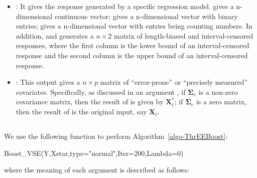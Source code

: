\begin{itemize}
    \item {}: It gives the response generated by a specific regression model.  gives a n-dimensional continuous vector;  gives a n-dimensional vector with binary entries;  gives a n-dimensional vector with entries being counting numbers. In addition,  and  generates a $n\times 2$ matrix of length-biased and interval-censored responses, where the first column is the lower bound of an interval-censored response and the second column is the upper bound of an interval-censored response.
    
    \item {}: This output gives a $n \times p$ matrix of ``error-prone'' or ``precisely measured'' covariates. Specifically, as discussed in an argument , if $\boldsymbol{\Sigma}_e$ is a non-zero covariance matrix, then the result of  is given by $\mathbf{X}_i^\ast$; if $\boldsymbol{\Sigma}_e$ is a zero matrix, then the result of  is the original input, say $\mathbf{X}_i$.
    
\end{itemize}


\subsection*{}

We use the following function to perform Algorithm~\ref{algo-ThrEEBoost}:
\begin{example}
                 Boost_VSE(Y,Xstar,type="normal",Iter=200,Lambda=0)
\end{example}
where the meaning of each argument is described as follows:

